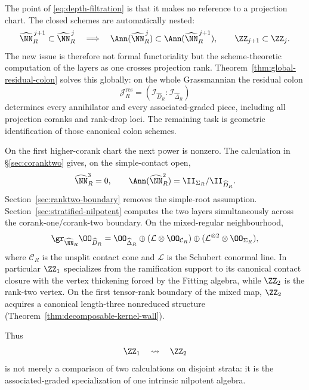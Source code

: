 The point of \eqref{eq:depth-filtration} is that it makes no reference
to a projection chart. The closed schemes are automatically nested:
\[
 \widehat\NN_R^{\,j+1}\subset\widehat\NN_R^{\,j}
 \quad\Longrightarrow\quad
 \Ann(\widehat\NN_R^{\,j})
 \subset
 \Ann(\widehat\NN_R^{\,j+1}),
 \qquad
 \ZZ_{j+1}\subset\ZZ_j.
\]
The new issue is therefore not formal functoriality but the
scheme-theoretic computation of the layers as one crosses projection
rank. Theorem~\ref{thm:global-residual-colon} solves this globally:
on the whole Grassmannian the residual colon
\[
 \mathcal J_R^{\mathrm{res}}
 =
 (\mathcal I_{\widehat D_R}:\mathcal I_{\widehat\Delta_R})
\]
determines every annihilator and every associated-graded piece,
including all projection coranks and rank-drop loci. The remaining
task is geometric identification of those canonical colon schemes.

On the first higher-corank chart the next power is nonzero. The
calculation in \S\ref{sec:coranktwo} gives, on the simple-contact open,
\[
 \widehat\NN_R^3=0,\qquad
 \Ann(\widehat\NN_R^2)=\II_{\Sigma_R}/\II_{\widehat D_R}.
\]
Section~\ref{sec:ranktwo-boundary} removes the simple-root assumption.
Section~\ref{sec:stratified-nilpotent} computes the two layers
simultaneously across the corank-one/corank-two boundary. On the
mixed-regular neighbourhood,
\[
 \gr_{\widehat\NN_R}\OO_{\widehat D_R}
 =
 \OO_{\widehat\Delta_R}
 \oplus
 (\mathcal L\otimes\OO_{\mathcal C_R})
 \oplus
 (\mathcal L^{\otimes2}\otimes\OO_{\Sigma_R}),
\]
where \(\mathcal C_R\) is the unsplit contact cone and
\(\mathcal L\) is the Schubert conormal line. In particular
\(\ZZ_1\) specializes from the ramification support to its canonical
contact closure with the vertex thickening forced by the Fitting
algebra, while \(\ZZ_2\) is the rank-two vertex. On the first
tensor-rank boundary of the mixed map, \(\ZZ_2\) acquires a canonical
length-three nonreduced structure
(Theorem~\ref{thm:decomposable-kernel-wall}).

Thus
\[
 \ZZ_1\quad\leadsto\quad\ZZ_2
\]
is not merely a comparison of two calculations on disjoint strata:
it is the associated-graded specialization of one intrinsic
nilpotent algebra.

